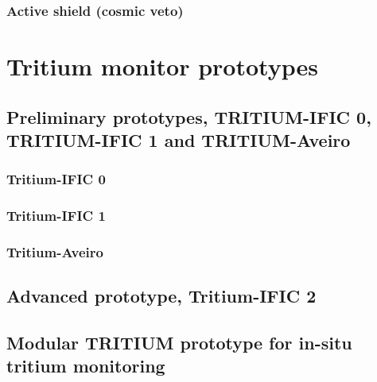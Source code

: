 \documentclass[12pt,a4paper]{book}
\begin{document}
	\subsection{Active shield (cosmic veto)} %
	\label{subsec:CharacterizationActiveShield}

\chapter{Tritium monitor prototypes}\label{chap:Prototypes}	
	
	\section[Preliminary prototypes]{Preliminary prototypes, TRITIUM-IFIC 0, TRITIUM-IFIC 1 and TRITIUM-Aveiro}\label{sec:Preliminary_prototypes}
		\subsection{Tritium-IFIC 0}
		
		\subsection{Tritium-IFIC 1}
		
		\subsection{Tritium-Aveiro}
		\newpage
		
	\section[Tritium-IFIC 2]{Advanced prototype, Tritium-IFIC 2}
	\newpage
		
	\section[Modular TRITIUM prototype]{Modular TRITIUM prototype for in-situ tritium monitoring}
	\newpage
\end{document}
